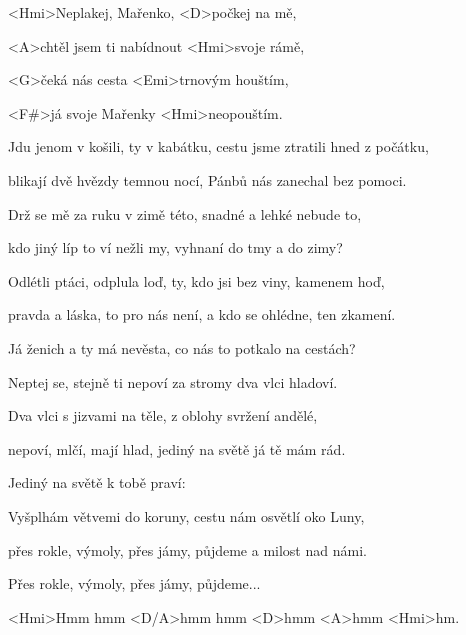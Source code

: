 

\zs
<Hmi>Neplakej, Mařenko, <D>počkej na mě,

<A>chtěl jsem ti nabídnout <Hmi>svoje rámě,

<G>čeká nás cesta <Emi>trnovým houštím,

<F#>já svoje Mařenky <Hmi>neopouštím.
\ks

\zs
Jdu jenom v košili, ty v kabátku, cestu jsme ztratili hned z počátku,

blikají dvě hvězdy temnou nocí, Pánbů nás zanechal bez pomoci.
\ks

\zs
Drž se mě za ruku v zimě této, snadné a lehké nebude to,

kdo jiný líp to ví nežli my, vyhnaní do tmy a do zimy?
\ks

\zs
Odlétli ptáci, odplula loď, ty, kdo jsi bez viny, kamenem hoď,

pravda a láska, to pro nás není, a kdo se ohlédne, ten zkamení.
\ks

\zs
Já ženich a ty má nevěsta, co nás to potkalo na cestách?

Neptej se, stejně ti nepoví za stromy dva vlci hladoví.
\ks

\zs
Dva vlci s jizvami na těle, z oblohy svržení andělé,

nepoví, mlčí, mají hlad, jediný na světě já tě mám rád.
\ks

\zs
Jediný na světě k tobě praví: 
\ks

\zs
Vyšplhám větvemi do koruny, cestu nám osvětlí oko Luny,

přes rokle, výmoly, přes jámy, půjdeme a milost nad námi.

Přes rokle, výmoly, přes jámy, půjdeme...

<Hmi>Hmm hmm <D/A>hmm hmm <D>hmm <A>hmm <Hmi>hm.
\ks

\kp
